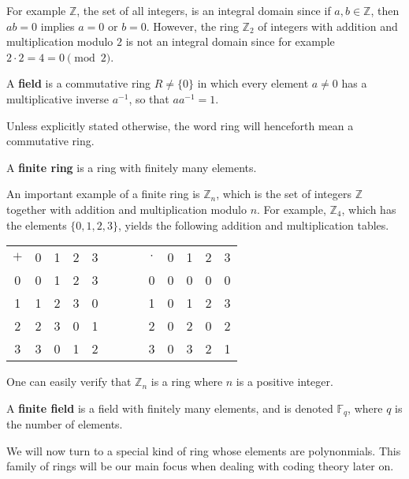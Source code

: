 \documentclass[english,bachelor]{liumaiex}
\begin{document}
For example $\mathbb{Z}$, the set of all integers, is an integral domain since if $a,b \in\mathbb{Z}$, then $ab=0$ implies $a=0$ or $b=0$. However, the ring $\mathbb{Z}_2$ of integers with addition and multiplication modulo $2$ is not an integral domain since for example $2\cdot2 = 4 = 0 \pmod{2}$.

\begin{define}
A \textbf{field} is a commutative ring $R\neq \{0\}$ in which every element $a \neq 0$ has a multiplicative inverse $a^{-1}$, so that $aa^{-1} = 1$.
\end{define}

\begin{rem}
Unless explicitly stated otherwise, the word ring will henceforth mean a commutative ring.
\end{rem}

\begin{define}
A \textbf{finite ring} is a ring with finitely many elements.
\end{define}

An important example of a finite ring is $\mathbb{Z}_n$, which is the set of integers $\mathbb{Z}$ together with addition and multiplication modulo $n$. For example, $\mathbb{Z}_4$, which has the elements $\{0,1,2,3\}$, yields the following addition and multiplication tables.
\newline

\begin{tabular}{c|c c c c c c c c|c c c c}
$+$ & 0 & 1 & 2 & 3 & & & & $\cdot$ & 0 & 1 & 2 & 3 \\
\cline{1-5} \cline{9-13} 0 & 0 & 1 & 2 & 3 & & & & 0 & 0 & 0 & 0 & 0 \\
1 & 1 & 2 & 3 & 0 & & & & 1 & 0 & 1 & 2 & 3 \\
2 & 2 & 3 & 0 & 1 & & & & 2 & 0 & 2 & 0 & 2 \\
3 & 3 & 0 & 1 & 2 & & & & 3 & 0 & 3 & 2 & 1 \\
\end{tabular}
\newline
One can easily verify that $\mathbb{Z}_n$ is a ring where $n$ is a positive integer.

\begin{define}
A \textbf{finite field} is a field with finitely many elements, and is denoted $\mathbb{F}_q$, where $q$ is the number of elements.
\end{define}

We will now turn to a special kind of ring whose elements are polynonmials. This family of rings will be our main focus when dealing with coding theory later on.
\end{document}
